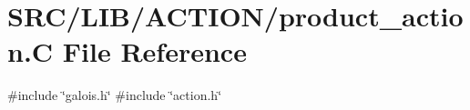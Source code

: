 \hypertarget{product__action_8_c}{}\section{S\+R\+C/\+L\+I\+B/\+A\+C\+T\+I\+O\+N/product\+\_\+action.C File Reference}
\label{product__action_8_c}
{\ttfamily \#include \char`\"{}galois.\+h\char`\"{}}\newline
{\ttfamily \#include \char`\"{}action.\+h\char`\"{}}\newline
